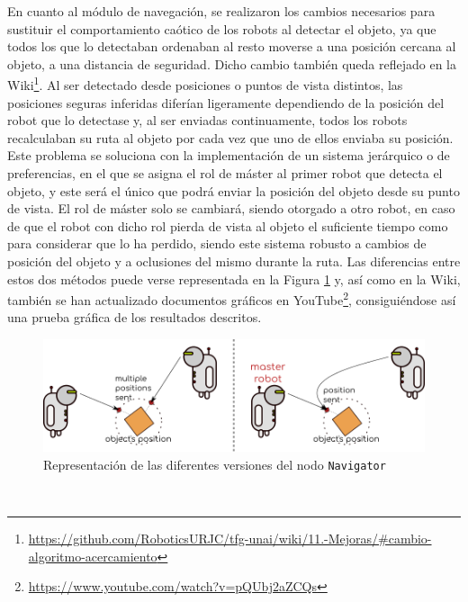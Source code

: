 En cuanto al módulo de navegación, se realizaron los cambios necesarios para
sustituir el comportamiento caótico de los robots al detectar el objeto, ya que
todos los que lo detectaban ordenaban al resto moverse a una posición cercana al
objeto, a una distancia de seguridad.
Dicho cambio también queda reflejado en la Wiki\footnote{
\href{https://github.com/RoboticsURJC/tfg-unai/wiki/11.-Mejoras-y-correcciones-del-swarm\_obj\_finder-\%5B30-Sep-\%E2\%80\%90-9-Nov\%5D\#cambio-en-la-l\%C3\%B3gica-del-algoritmo-en-el-modo-de-acercamiento-al-objeto}{https://github.com/RoboticsURJC/tfg-unai/wiki/11.-Mejoras/\#cambio-algoritmo-acercamiento}}.
Al ser detectado desde posiciones o puntos de vista distintos, las posiciones
seguras inferidas diferían ligeramente dependiendo de la posición del robot que
lo detectase y, al ser enviadas continuamente, todos los robots recalculaban su
ruta al objeto por cada vez que uno de ellos enviaba su posición.
\\

Este problema se soluciona con la implementación de un sistema jerárquico o de
preferencias, en el que se asigna el rol de máster al primer robot que detecta
el objeto, y este será el único que podrá enviar la posición del objeto desde su
punto de vista.
El rol de máster solo se cambiará, siendo otorgado a otro robot, en caso de que
el robot con dicho rol pierda de vista al objeto el suficiente tiempo como para
considerar que lo ha perdido, siendo este sistema robusto a cambios de posición
del objeto y a oclusiones del mismo durante la ruta.
Las diferencias entre estos dos métodos puede verse representada en la Figura
\ref{fig:navigator_versions} y, así como en la Wiki, también se han actualizado
documentos gráficos en YouTube\footnote{
\href{https://www.youtube.com/watch?v=pQUbj2aZCQs}{https://www.youtube.com/watch?v=pQUbj2aZCQs}},
consiguiéndose así una prueba gráfica de los resultados descritos.
\\

\begin{figure} [h!]
  \begin{center}
    \includegraphics[width=15cm]{figs/navigator_versions}
  \end{center}
  \caption{Representación de las diferentes versiones del nodo \texttt{Navigator}}
  \label{fig:navigator_versions}
\end{figure}\



